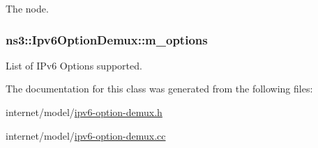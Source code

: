 The node. 

\subsubsection[{\texorpdfstring{m\+\_\+options}{m_options}}]{ ns3\+::\+Ipv6\+Option\+Demux\+::m\+\_\+options\hspace{0.3cm}{\ttfamily [private]}}\hypertarget{classns3_1_1Ipv6OptionDemux_abf65e5e695f571ff6c28d28ea32ce206}{}\label{classns3_1_1Ipv6OptionDemux_abf65e5e695f571ff6c28d28ea32ce206}


List of I\+Pv6 Options supported. 



The documentation for this class was generated from the following files\+:\begin{DoxyCompactItemize}
\item 
internet/model/\hyperlink{ipv6-option-demux_8h}{ipv6-\/option-\/demux.\+h}\item 
internet/model/\hyperlink{ipv6-option-demux_8cc}{ipv6-\/option-\/demux.\+cc}\end{DoxyCompactItemize}
